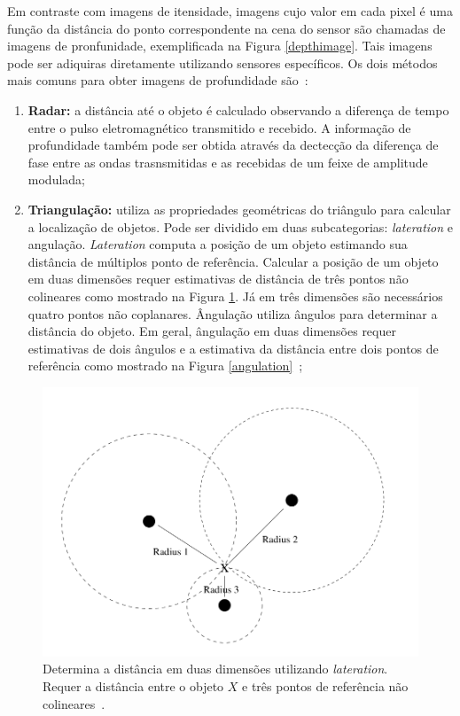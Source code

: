 	Em contraste com imagens de itensidade, imagens cujo valor em cada pixel é uma função da distância do ponto correspondente na cena do sensor são chamadas de imagens de pronfunidade, exemplificada na Figura \ref{depthimage}. Tais imagens pode ser adiquiras diretamente utilizando sensores específicos. Os dois métodos mais comuns para obter imagens de profundidade são~\cite{jain}:

		\begin{enumerate}
			\item \textbf{Radar:} a distância até o objeto é calculado observando a diferença de tempo entre o pulso eletromagnético transmitido e recebido. A informação de profundidade também pode ser obtida através da dectecção da diferença de fase entre as ondas trasnsmitidas e as recebidas de um feixe de amplitude modulada;
			\item \textbf{Triangulação:} utiliza as propriedades geométricas do triângulo para calcular a localização de objetos. Pode ser dividido em duas subcategorias: \textit{lateration} e angulação. \textit{Lateration} computa a posição de um objeto estimando sua distância de múltiplos ponto de referência. Calcular a posição de um objeto em duas dimensões requer estimativas de distância de três pontos não colineares como mostrado na Figura \ref{lateration}. Já em três dimensões são necessários quatro pontos não coplanares. Ângulação utiliza ângulos para determinar a distância do objeto. Em geral, ângulação em duas dimensões requer estimativas de dois ângulos e a estimativa da distância entre dois pontos de referência como mostrado na Figura \ref{angulation}~\cite{triangulacao};
		\end{enumerate}

		\begin{figure}[hbt]
		\begin{center}
			\includegraphics[scale=0.5]{figuras/2.FundamentacaoTeorica/lateration.png}
		\end{center}
		\caption{Determina a distância em duas dimensões utilizando \textit{lateration}. Requer a distância entre o objeto $\displaystyle X$ e três pontos de referência não colineares~\cite{triangulacao}.}
		\label{lateration}
	\end{figure}


